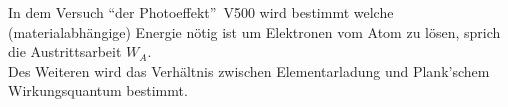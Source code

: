 In dem Versuch \textquotedblleft der Photoeffekt\textquotedblright \, V500
wird bestimmt welche (materialabhängige) Energie nötig ist um Elektronen vom Atom zu lösen, sprich die Austrittsarbeit $W_A$. \\
Des Weiteren wird das Verhältnis zwischen Elementarladung und Plank'schem Wirkungsquantum bestimmt.\\

